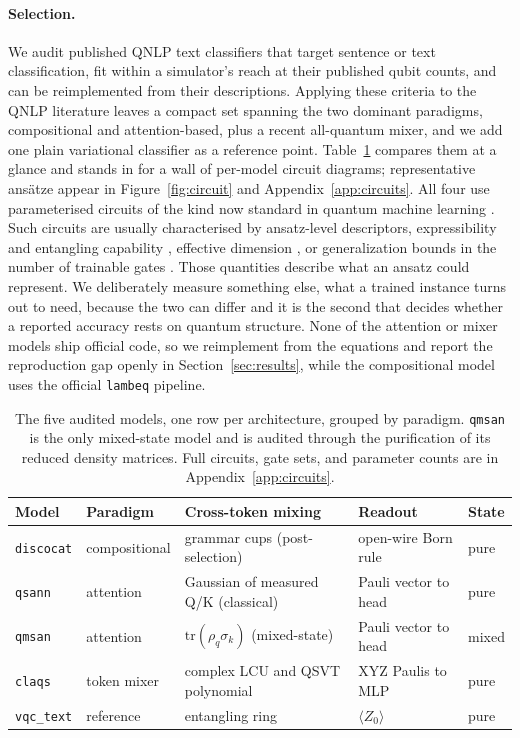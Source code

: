 \documentclass[10pt]{article}
\begin{document}
\paragraph{Selection.} We audit published QNLP text classifiers that target sentence or text
classification, fit within a simulator's reach at their published qubit counts, and can be
reimplemented from their descriptions. Applying these criteria to the QNLP literature leaves a
compact set spanning the two dominant paradigms, compositional and attention-based, plus a recent
all-quantum mixer, and we add one plain variational classifier as a reference point.
Table~\ref{tab:models} compares them at a glance and stands in for a wall of per-model circuit
diagrams; representative ansätze appear in Figure~\ref{fig:circuit} and Appendix~\ref{app:circuits}.
All four use parameterised circuits of the kind now standard in quantum machine learning
\citep{biamonte2017,mitarai2018,benedetti2019}. Such circuits are usually characterised by
ansatz-level descriptors, expressibility and entangling capability \citep{sim2019}, effective
dimension \citep{abbas2021}, or generalization bounds in the number of trainable gates
\citep{caro2022}. Those quantities describe what an ansatz could represent. We deliberately measure
something else, what a trained instance turns out to need, because the two can differ and it is the
second that decides whether a reported accuracy rests on quantum structure. None of the attention or mixer models ship official code, so we reimplement from the equations and
report the reproduction gap openly in Section~\ref{sec:results}, while the compositional model uses
the official \texttt{lambeq} pipeline.

\begin{table}[t]
\centering\small
\begin{tabular}{lllll}
\toprule
Model & Paradigm & Cross-token mixing & Readout & State \\
\midrule
\texttt{discocat} & compositional & grammar cups (post-selection) & open-wire Born rule & pure \\
\texttt{qsann} & attention & Gaussian of measured Q/K (classical) & Pauli vector to head & pure \\
\texttt{qmsan} & attention & $\mathrm{tr}(\rho_q\sigma_k)$ (mixed-state) & Pauli vector to head & mixed \\
\texttt{claqs} & token mixer & complex LCU and QSVT polynomial & XYZ Paulis to MLP & pure \\
\texttt{vqc\_text} & reference & entangling ring & $\langle Z_0\rangle$ & pure \\
\bottomrule
\end{tabular}
\caption{The five audited models, one row per architecture, grouped by paradigm.
\texttt{qmsan} is the only mixed-state model and is audited through the purification of its reduced
density matrices. Full circuits, gate sets, and parameter counts are in Appendix~\ref{app:circuits}.}
\label{tab:models}
\end{table}
\end{document}
